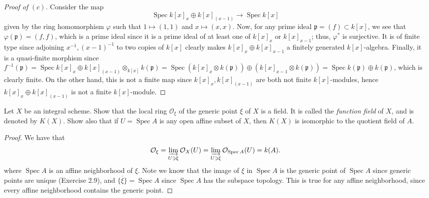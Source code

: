 \documentclass[10pt]{article}
\theoremstyle{definition}
\theoremstyle{remark}
\numberwithin{equation}{section}
\numberwithin{figure}{subsubsection}
\DeclareMathOperator{\Spec}{Spec}
\newcommand{\OO}{\mathcal{O}}
\begin{document}
\begin{proof}[Proof of $(c)$]
  Consider the map
  \begin{equation*}
    \Spec k[x]_x \oplus k[x]_{(x-1)} \to \Spec k[x]
  \end{equation*}
  given by the ring homomorphism $\varphi$ such that $1 \mapsto (1,1)$ and $x \mapsto (x,x)$. Now, for any prime ideal $\mathfrak{p} = (f) \subset k[x]$, we see that $\varphi(\mathfrak{p}) = (f,f)$, which is a prime ideal since it is a prime ideal of at least one of $k[x]_x$ or $k[x]_{x-1}$; thus, $\varphi^*$ is surjective. It is of finite type since adjoining $x^{-1},(x-1)^{-1}$ to two copies of $k[x]$ clearly makes $k[x]_x \oplus k[x]_{x-1}$ a finitely generated $k[x]$-algebra. Finally, it is a quasi-finite morphism since $f^{-1}(\mathfrak{p}) = \Spec k[x]_x \oplus k[x]_{(x-1)} \otimes_{k[x]} k(\mathfrak{p}) = \Spec (k[x]_x \otimes k(\mathfrak{p})) \oplus (k[x]_{x-1} \otimes k(\mathfrak{p})) = \Spec k(\mathfrak{p}) \oplus k(\mathfrak{p})$, which is clearly finite. On the other hand, this is not a finite map since $k[x]_x,k[x]_{(x-1)}$ are both not finite $k[x]$-modules, hence $k[x]_x \oplus k[x]_{(x-1)}$ is not a finite $k[x]$-module.
\end{proof}

\begin{problem}
  Let $X$ be an integral scheme. Show that the local ring $\OO_\xi$ of the generic point $\xi$ of $X$ is a field. It is called the \emph{function field} of $X$, and is denoted by $K(X)$. Show also that if $U = \Spec A$ is any open affine subset of $X$, then $K(X)$ is isomorphic to the quotient field of $A$.
\end{problem}
\begin{proof}
  We have that
  \begin{equation*}
    \OO_\xi = \varinjlim_{U \ni \xi} \OO_X(U) = \varinjlim_{U \ni \xi} \OO_{\Spec A}(U) = k(A).
  \end{equation*}
  where $\Spec A$ is an affine neighborhood of $\xi$. Note we know that the image of $\xi$ in $\Spec A$ is the generic point of $\Spec A$ since generic points are unique (Exercise 2.9), and $\overline{\{\xi\}} = \Spec A$ since $\Spec A$ has the subspace topology. This is true for any affine neighborhood, since every affine neighborhood contains the generic point.
\end{proof}
\end{document}
